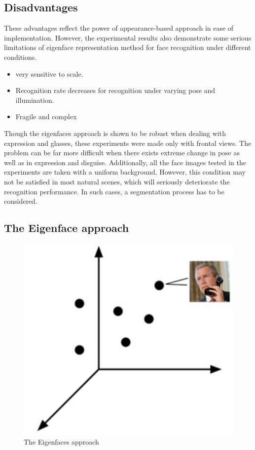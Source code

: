 \documentclass[a4paper,12pt]{report}
\begin{document}
		\subsection{Disadvantages}
			These advantages reflect the power of appearance-based approach in ease of implementation. However, the experimental results also demonstrate some serious limitations of eigenface representation method for face recognition under different conditions.
			\begin{itemize}
			      \item{very sensitive to scale.}
			      \item{Recognition rate decreases for recognition under varying pose and illumination.}
			      \item{Fragile and complex}
			\end{itemize}
			
			Though the eigenfaces approach is shown to be robust when dealing with expression and glasses, these experiments were made only with frontal views. The problem can be far more difficult when there exists extreme change in pose as well as in expression and disguise. Additionally, all the face images tested in the experiments are taken with a uniform background. However, this condition may not be satisfied in most natural scenes, which will seriously deteriorate the recognition performance. In such cases, a segmentation process has to be considered. 
			
		\subsection{The Eigenface approach}
		\begin{figure}[h]
					\centering
					\caption{\label{face recognation} The Eigenfaces approach \cite{haar_lbp_hog_comp_pdf}}
					\includegraphics[scale=0.55]{capture1.png}
				\end{figure}
				
\end{document}
